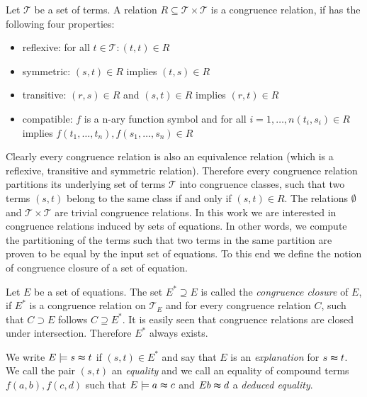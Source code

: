 \begin{definition}

Let $\mathcal{T}$ be a set of terms.
A relation $R \subseteq \mathcal{T} \times \mathcal{T}$ is a congruence relation, if has the following four properties:
\begin{itemize}
	\item reflexive: for all $t \in \mathcal{T}: (t,t) \in R$
	\item symmetric: $(s,t) \in R$ implies $(t,s) \in R$
	\item transitive: $(r,s) \in R$ and $(s,t) \in R$ implies $(r,t) \in R$
	\item compatible: $f$ is a n-ary function symbol and for all $i = 1,\ldots,n (t_i,s_i) \in R$ implies $f(t_1,\ldots,t_n),f(s_1,\ldots,s_n) \in R$
\end{itemize}

\end{definition}

Clearly every congruence relation is also an equivalence relation (which is a reflexive, transitive and symmetric relation).
Therefore every congruence relation partitions its underlying set of terms $\mathcal{T}$ into congruence classes, such that two terms $(s,t)$ belong to the same class if and only if $(s,t) \in R$.
The relations $\emptyset$ and $\mathcal{T} \times \mathcal{T}$ are trivial congruence relations.
In this work we are interested in congruence relations induced by sets of equations.
In other words, we compute the partitioning of the terms such that two terms in the same partition are proven to be equal by the input set of equations.
To this end we define the notion of congruence closure of a set of equation.

\begin{definition}

Let $E$ be a set of equations.
The set $E^* \supseteq E$ is called the \emph{congruence closure} of $E$, 
if $E^*$ is a congruence relation on $\mathcal{T}_E$ and for every congruence relation $C$, such that $C \supset E$ follows $C \supseteq E^*$.
It is easily seen that congruence relations are closed under intersection.
Therefore $E^*$ always exists.

\noindent We write $E \models s \thickapprox t$ if $(s,t) \in E^*$ and say that $E$ is an \emph{explanation} for $s \thickapprox t$.
We call the pair $(s,t)$ an \emph{equality} and we call an equality of compound terms $f(a,b),f(c,d)$ such that $E \models a \thickapprox c$ and $E b \thickapprox d$ a \emph{deduced equality}.

\end{definition}

